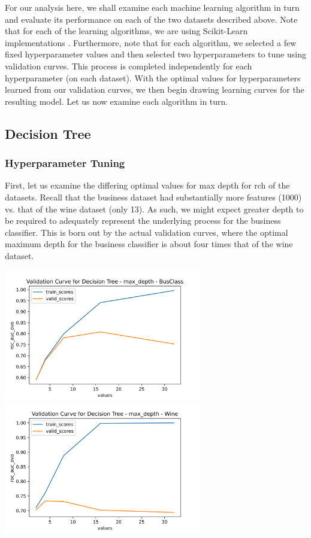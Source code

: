 \documentclass[
	letterpaper, %
]{jdf}
\begin{document}
For our analysis here, we shall examine each machine learning algorithm in turn and evaluate its performance on each of the two datasets described above. Note that for each of the learning algorithms, we are using Scikit-Learn implementations \citep{sklearn_api}. Furthermore, note that for each algorithm, we selected a few fixed hyperparameter values and then selected two hyperparameters to tune using validation curves. This process is completed independently for each hyperparameter (on each dataset). With the optimal values for hyperparameters learned from our validation curves, we then begin drawing learning curves for the resulting model. Let us now examine each algorithm in turn.


\subsection{Decision Tree}

\subsubsection{Hyperparameter Tuning}
First, let us examine the differing optimal values for max depth for rch of the datasets. Recall that the business dataset had substantially more features (1000) vs. that of the wine dataset (only 13). As such, we might expect greater depth to be required to adequately represent the underlying process for the business classifier. This is born out by the actual validation curves, where the optimal maximum depth for the business classifier is about four times that of the wine dataset.

\includegraphics[width=3.4in]{Figures/BusClass-0920/DT/val_curve_0.png}
\includegraphics[width=3.4in]{Figures/Wine-0921/DT/val_curve_0.png}
\end{document}
